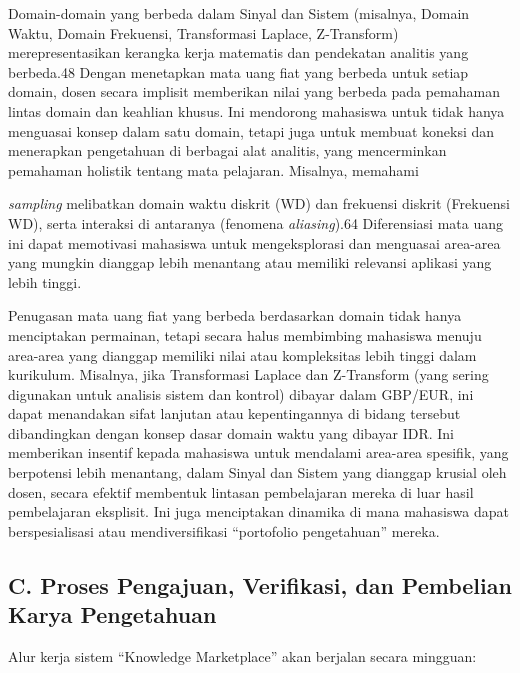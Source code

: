 \documentclass[
  letterpaper,
  DIV=11,
  numbers=noendperiod]{scrreprt}
\begin{document}
Domain-domain yang berbeda dalam Sinyal dan Sistem (misalnya, Domain
Waktu, Domain Frekuensi, Transformasi Laplace, Z-Transform)
merepresentasikan kerangka kerja matematis dan pendekatan analitis yang
berbeda.48 Dengan menetapkan mata uang fiat yang berbeda untuk setiap
domain, dosen secara implisit memberikan nilai yang berbeda pada
pemahaman lintas domain dan keahlian khusus. Ini mendorong mahasiswa
untuk tidak hanya menguasai konsep dalam satu domain, tetapi juga untuk
membuat koneksi dan menerapkan pengetahuan di berbagai alat analitis,
yang mencerminkan pemahaman holistik tentang mata pelajaran. Misalnya,
memahami

\emph{sampling} melibatkan domain waktu diskrit (WD) dan frekuensi
diskrit (Frekuensi WD), serta interaksi di antaranya (fenomena
\emph{aliasing}).64 Diferensiasi mata uang ini dapat memotivasi
mahasiswa untuk mengeksplorasi dan menguasai area-area yang mungkin
dianggap lebih menantang atau memiliki relevansi aplikasi yang lebih
tinggi.

Penugasan mata uang fiat yang berbeda berdasarkan domain tidak hanya
menciptakan permainan, tetapi secara halus membimbing mahasiswa menuju
area-area yang dianggap memiliki nilai atau kompleksitas lebih tinggi
dalam kurikulum. Misalnya, jika Transformasi Laplace dan Z-Transform
(yang sering digunakan untuk analisis sistem dan kontrol) dibayar dalam
GBP/EUR, ini dapat menandakan sifat lanjutan atau kepentingannya di
bidang tersebut dibandingkan dengan konsep dasar domain waktu yang
dibayar IDR. Ini memberikan insentif kepada mahasiswa untuk mendalami
area-area spesifik, yang berpotensi lebih menantang, dalam Sinyal dan
Sistem yang dianggap krusial oleh dosen, secara efektif membentuk
lintasan pembelajaran mereka di luar hasil pembelajaran eksplisit. Ini
juga menciptakan dinamika di mana mahasiswa dapat berspesialisasi atau
mendiversifikasi ``portofolio pengetahuan'' mereka.

\subsection{C. Proses Pengajuan, Verifikasi, dan Pembelian Karya
Pengetahuan}\label{c.-proses-pengajuan-verifikasi-dan-pembelian-karya-pengetahuan}

Alur kerja sistem ``Knowledge Marketplace'' akan berjalan secara
mingguan:
\end{document}
